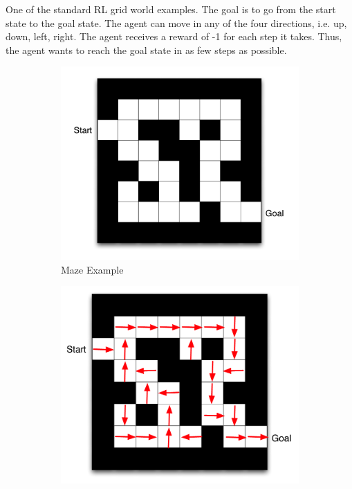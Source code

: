 \begin{example}
    One of the standard RL grid world examples. The goal is to go from the 
    start state to the goal state. The agent can move in any of the four directions,
    i.e. up, down, left, right. The agent receives a reward of -1 for each step it takes.
    Thus, the agent wants to reach the goal state in as few steps as possible.
    \begin{figure}[H]
        \centering
        \begin{subfigure}[b]{0.3\textwidth}
            \includegraphics[width=\textwidth]{figures/maze_blank.png}
            \caption{Maze Example}
            \label{fig:maze_example}
        \end{subfigure}
        \begin{subfigure}[b]{0.3\textwidth}
            \includegraphics[width=\textwidth]{figures/maze_policy.png}

\end{subfigure}
\end{figure}
\end{example}

